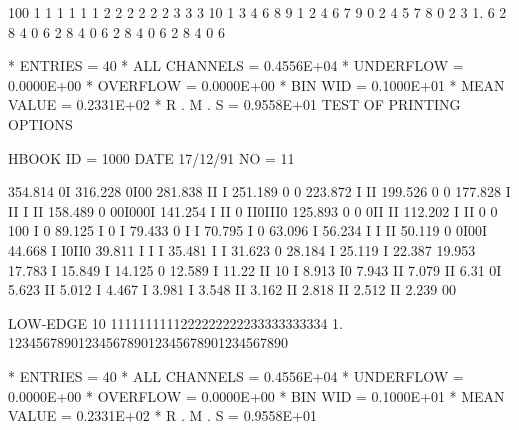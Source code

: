 \begin{Listing}
     100                               1   1   1   1   1   1   2   2   2   2   2   2   3   3   3
      10       1   3   4   6   8   9   1   2   4   6   7   9   0   2   4   5   7   8   0   2   3
       1.      6   2   8   4   0   6   2   8   4   0   6   2   8   4   0   6   2   8   4   0   6
 
 * ENTRIES =         40      * ALL CHANNELS = 0.4556E+04      * UNDERFLOW = 0.0000E+00      * OVERFLOW = 0.0000E+00
 * BIN WID = 0.1000E+01      * MEAN VALUE   = 0.2331E+02      * R . M . S = 0.9558E+01
\newpage
 TEST OF PRINTING OPTIONS                                                        
 
 HBOOK     ID =      1000                                        DATE  17/12/91              NO =  11
 
      354.814                 0I
      316.228                0I00
      281.838               II  I
      251.189               0    0
      223.872              I     II
      199.526              0      0
      177.828              I      II            I  II
      158.489                      0            00I000I
      141.254             I        II         0 II0III0
      125.893             0         0        0II      II
      112.202             I                 II 0       0
      100                            I      0
       89.125            I           0      I
       79.433            0           I     I
       70.795            I                 0
       63.096                              I
       56.234           I             I II
       50.119           0             0I00I
       44.668           I             I0II0
       39.811           I              I  I
       35.481          I               I
       31.623          0
       28.184          I
       25.119          I
       22.387
       19.953
       17.783         I
       15.849         I
       14.125         0
       12.589         I
       11.22         II
       10            I
        8.913       I0
        7.943       II
        7.079       II
        6.31        0I
        5.623       II
        5.012       I
        4.467       I
        3.981       I
        3.548     II
        3.162     II
        2.818     II
        2.512     II
        2.239     00
 
 LOW-EDGE  10            1111111111222222222233333333334
            1.  1234567890123456789012345678901234567890
 
 * ENTRIES =         40      * ALL CHANNELS = 0.4556E+04      * UNDERFLOW = 0.0000E+00      * OVERFLOW = 0.0000E+00
 * BIN WID = 0.1000E+01      * MEAN VALUE   = 0.2331E+02      * R . M . S = 0.9558E+01
 

\end{Listing}
